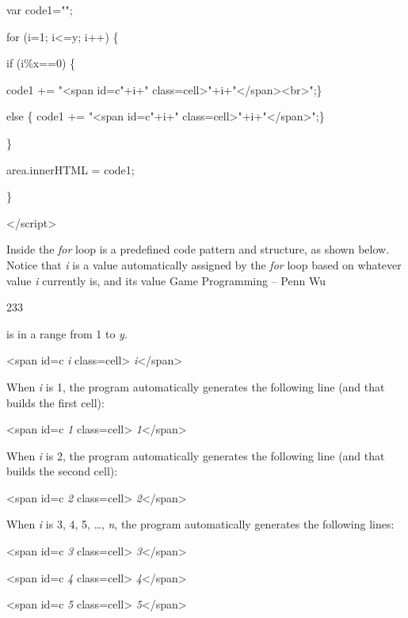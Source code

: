 \documentclass[
]{article}
\begin{document}
var code1="";

for (i=1; i\textless=y; i++) \{

if (i\%x==0) \{

code1 += "\textless span id=c"+i+"
class=\textquotesingle cell\textquotesingle\textgreater"+i+"\textless/span\textgreater\textless br\textgreater";\}

else \{ code1 += "\textless span id=c"+i+"
class=\textquotesingle cell\textquotesingle\textgreater"+i+"\textless/span\textgreater";\}

\}

area.innerHTML = code1;

\}

\textless/script\textgreater{}

Inside the \emph{for} loop is a predefined code pattern and structure,
as shown below. Notice that \emph{i} is a value automatically assigned
by the \emph{for} loop based on whatever value \emph{i} currently is,
and its value Game Programming -- Penn Wu

233

\protect\hypertarget{index_split_012.htmlux5cux23p234}{}{}is in a range
from 1 to \emph{y}.

\textless span id=c \emph{i}
class=\textquotesingle cell\textquotesingle\textgreater{}
\emph{i}\textless/span\textgreater{}

When \emph{i} is 1, the program automatically generates the following
line (and that builds the first cell):

\textless span id=c \emph{1}
class=\textquotesingle cell\textquotesingle\textgreater{}
\emph{1}\textless/span\textgreater{}

When \emph{i} is 2, the program automatically generates the following
line (and that builds the second cell):

\textless span id=c \emph{2}
class=\textquotesingle cell\textquotesingle\textgreater{}
\emph{2}\textless/span\textgreater{}

When \emph{i} is 3, 4, 5, \ldots, \emph{n}, the program automatically
generates the following lines:

\textless span id=c \emph{3}
class=\textquotesingle cell\textquotesingle\textgreater{}
\emph{3}\textless/span\textgreater{}

\textless span id=c \emph{4}
class=\textquotesingle cell\textquotesingle\textgreater{}
\emph{4}\textless/span\textgreater{}

\textless span id=c \emph{5}
class=\textquotesingle cell\textquotesingle\textgreater{}
\emph{5}\textless/span\textgreater{}
\end{document}
